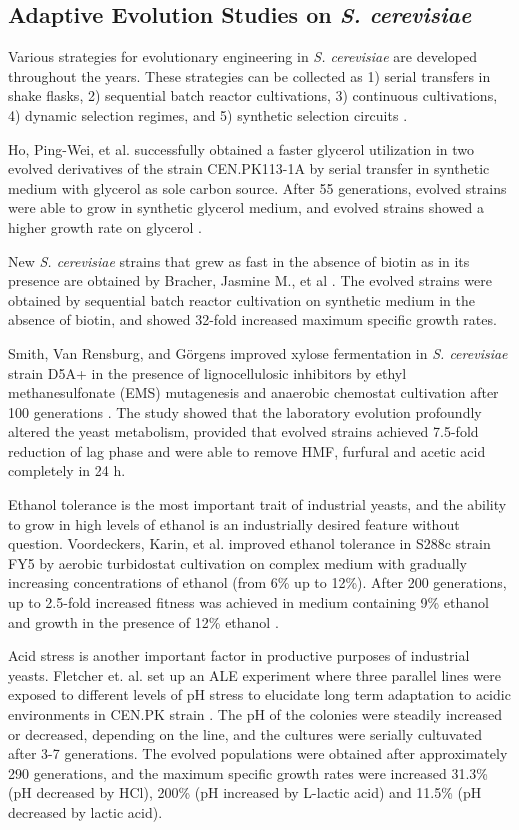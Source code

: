 \subsection{Adaptive Evolution Studies on \emph{S. cerevisiae}}

Various strategies for evolutionary engineering in \emph{S. cerevisiae} are developed throughout the years. These strategies can be collected as 1) serial transfers in shake flasks, 2) sequential batch reactor cultivations, 3) continuous cultivations, 4) dynamic selection regimes, and 5) synthetic selection circuits \cite{mans2018under}.

Ho, Ping-Wei, et al. successfully obtained a faster glycerol utilization in two evolved derivatives of the strain CEN.PK113-1A by serial transfer in synthetic medium with glycerol as sole carbon source. After 55 generations, evolved strains were able to grow in synthetic glycerol medium, and evolved strains showed a higher growth rate on glycerol \cite{ho2017sole}.

New \emph{S. cerevisiae} strains that grew as fast in the absence of biotin as in its presence are obtained by Bracher, Jasmine M., et al \cite{bracher2017laboratory}. The evolved strains were obtained by sequential batch reactor cultivation on synthetic medium in the absence of biotin, and showed 32-fold increased maximum specific growth rates.

Smith, Van Rensburg, and Görgens improved xylose fermentation in \emph{S. cerevisiae} strain D5A+ in the presence of lignocellulosic inhibitors by ethyl methanesulfonate (EMS) mutagenesis and anaerobic chemostat cultivation after 100  generations \cite{smith2014simultaneously}. The study showed that the laboratory evolution profoundly altered the yeast metabolism, provided that evolved strains achieved 7.5-fold reduction of lag phase and were able to remove HMF, furfural and acetic acid completely in 24 h.

Ethanol tolerance is the most important trait of industrial yeasts, and the ability to grow in high levels of ethanol is an industrially desired feature without question. Voordeckers, Karin, et al. improved ethanol tolerance in S288c strain FY5 by aerobic turbidostat cultivation on complex medium with gradually increasing concentrations of ethanol (from 6\% up to 12\%). After 200 generations, up to 2.5-fold increased fitness was achieved in medium containing 9\% ethanol and growth in the presence of 12\% ethanol \cite{voordeckers2015adaptation}.

Acid stress is another important factor in productive purposes of industrial yeasts. Fletcher et. al. set up an ALE experiment where three parallel lines were exposed to different levels of pH stress to elucidate long term adaptation to acidic environments in CEN.PK strain \cite{fletcher2017evolutionary}. The pH of the colonies were steadily increased or decreased, depending on the line, and the cultures were serially cultuvated after 3-7 generations. The evolved populations were obtained after approximately 290 generations, and the maximum specific growth rates were increased 31.3\% (pH decreased by HCl), 200\% (pH increased by L-lactic acid) and 11.5\% (pH decreased by lactic acid).

